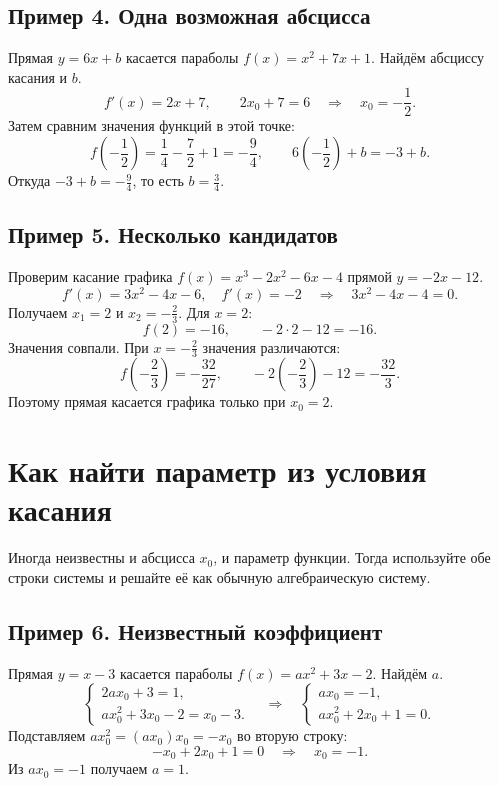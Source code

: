 \documentclass[a4paper,12pt]{article}
\begin{document}
\subsection{Пример 4. Одна возможная абсцисса}
Прямая $y=6x+b$ касается параболы $f(x)=x^2+7x+1$. Найдём абсциссу касания и $b$.
\[
f'(x)=2x+7,\qquad 2x_0+7=6\quad\Longrightarrow\quad x_0=-\frac12.
\]
Затем сравним значения функций в этой точке:
\[
f\left(-\frac12\right)=\frac14-\frac72+1=-\frac94,
\qquad 6\left(-\frac12\right)+b=-3+b.
\]
Откуда $-3+b=-\frac94$, то есть $\boxed{b=\frac34}$.

\subsection{Пример 5. Несколько кандидатов}
Проверим касание графика $f(x)=x^3-2x^2-6x-4$ прямой $y=-2x-12$.
\[
f'(x)=3x^2-4x-6,\quad f'(x)=-2
\quad\Longrightarrow\quad 3x^2-4x-4=0.
\]
Получаем $x_1=2$ и $x_2=-\frac23$. Для $x=2$:
\[
f(2)=-16,\qquad -2\cdot2-12=-16.
\]
Значения совпали. При $x=-\frac23$ значения различаются:
\[
f\left(-\frac23\right)=-\frac{32}{27},\qquad
-2\left(-\frac23\right)-12=-\frac{32}{3}.
\]
Поэтому прямая касается графика только при $\boxed{x_0=2}$.

\section{Как найти параметр из условия касания}
Иногда неизвестны и абсцисса $x_0$, и параметр функции. Тогда используйте обе строки системы и решайте её как обычную алгебраическую систему.

\subsection{Пример 6. Неизвестный коэффициент}
Прямая $y=x-3$ касается параболы $f(x)=ax^2+3x-2$. Найдём $a$.
\[
\begin{cases}
2ax_0+3=1,\\
ax_0^2+3x_0-2=x_0-3.
\end{cases}
\quad\Longrightarrow\quad
\begin{cases}
ax_0=-1,\\
ax_0^2+2x_0+1=0.
\end{cases}
\]
Подставляем $ax_0^2=(ax_0)x_0=-x_0$ во вторую строку:
\[
-x_0+2x_0+1=0\quad\Longrightarrow\quad x_0=-1.
\]
Из $ax_0=-1$ получаем $\boxed{a=1}$.
\end{document}
